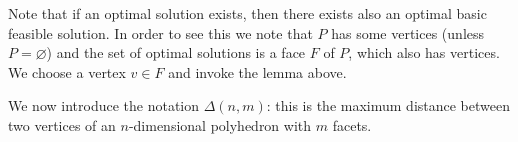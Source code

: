 \documentclass[12pt]{extarticle}
\begin{document}
Note that if an optimal solution exists, then there exists also an optimal basic feasible solution.
In order to see this we note that $P$ has some vertices (unless $P = \varnothing$) and the set of
optimal solutions is a face $F$ of $P$, which also has vertices. We choose a vertex $v \in F$ and
invoke the lemma above.

We now introduce the notation $\Delta(n, m)$: this is the maximum distance between two vertices of
an $n$-dimensional polyhedron with $m$ facets.
\end{document}
